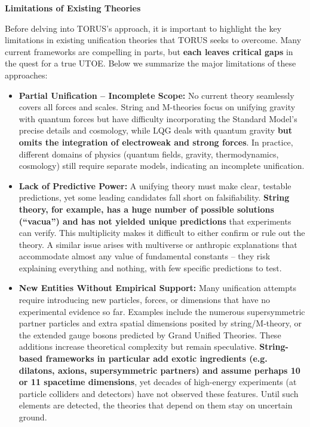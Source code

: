 \documentclass[]{article}
\begin{document}
\textbf{Limitations of Existing Theories}

Before delving into TORUS's approach, it is important to highlight the
key limitations in existing unification theories that TORUS seeks to
overcome. Many current frameworks are compelling in parts, but
\textbf{each leaves critical gaps} in the quest for a true UTOE. Below
we summarize the major limitations of these approaches:

\begin{itemize}
\item
  \textbf{Partial Unification -- Incomplete Scope:} No current theory
  seamlessly covers all forces and scales. String and M-theories focus
  on unifying gravity with quantum forces but have difficulty
  incorporating the Standard Model's precise details and cosmology,
  while LQG deals with quantum gravity \textbf{but omits the integration
  of electroweak and strong forces}​. In practice, different domains of
  physics (quantum fields, gravity, thermodynamics, cosmology) still
  require separate models, indicating an incomplete unification.
\item
  \textbf{Lack of Predictive Power:} A unifying theory must make clear,
  testable predictions, yet some leading candidates fall short on
  falsifiability. \textbf{String theory, for example, has a huge number
  of possible solutions (``vacua'') and has not yielded unique
  predictions} that experiments can verify. This multiplicity makes it
  difficult to either confirm or rule out the theory. A similar issue
  arises with multiverse or anthropic explanations that accommodate
  almost any value of fundamental constants -- they risk explaining
  everything and nothing, with few specific predictions to test.
\item
  \textbf{New Entities Without Empirical Support:} Many unification
  attempts require introducing new particles, forces, or dimensions that
  have no experimental evidence so far. Examples include the numerous
  supersymmetric partner particles and extra spatial dimensions posited
  by string/M-theory, or the extended gauge bosons predicted by Grand
  Unified Theories. These additions increase theoretical complexity but
  remain speculative. \textbf{String-based frameworks in particular add
  exotic ingredients (e.g. dilatons, axions, supersymmetric partners)
  and assume perhaps 10 or 11 spacetime dimensions}​, yet decades of
  high-energy experiments (at particle colliders and detectors) have not
  observed these features. Until such elements are detected, the
  theories that depend on them stay on uncertain ground.

\end{itemize}
\end{document}
